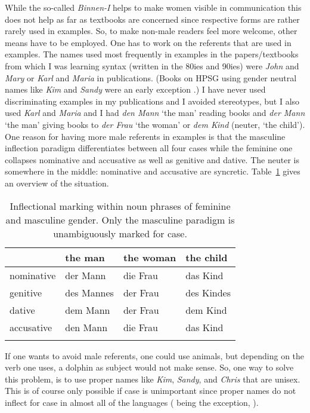 While the so-called \emph{Binnen-I} helps to make women visible in communication this does not help
as far as textbooks are concerned since respective forms are rather rarely used in examples. So, to
make non-male readers feel more welcome, other means have to be employed. One has to work on the
referents that are used in examples. The names used most frequently in examples in the papers/textbooks from which I was learning syntax
(written in the 80ies and 90ies) were \emph{John} and \emph{Mary} or \emph{Karl} and \emph{Maria} in
 publications. (Books on HPSG using gender neutral names like \emph{Kim} and \emph{Sandy} were an early exception \citep{ps,ps2}.)
I have never used discriminating examples in my publications and I avoided stereotypes, but I also used
\emph{Karl} and \emph{Maria} and I had \emph{den Mann} `the man' reading books and \emph{der Mann}
`the man' giving books to \emph{der Frau} `the woman' or \emph{dem Kind} (neuter, `the child'). One
reason for having more male referents in  examples is that the masculine inflection paradigm
differentiates between all four cases while the feminine one collapses nominative and accusative as
well as genitive and dative. The neuter is somewhere in the middle: nominative and accusative are syncretic. Table~\ref{table-German-case-syncretism} gives an overview of the situation.
\begin{table}
\begin{tabular}{llll}\lsptoprule
           & the man    & the woman & the child\\\midrule
nominative & der Mann   & die Frau  & das Kind\\
genitive   & des Mannes & der Frau  & des Kindes\\
dative     & dem Mann   & der Frau  & dem Kind\\
accusative & den Mann   & die Frau  & das Kind\\
\lspbottomrule
\end{tabular}
\caption{\label{table-German-case-syncretism}Inflectional marking within noun phrases of feminine and masculine gender. Only the masculine
  paradigm is unambiguously marked for case.}
\end{table}  
If one wants to avoid male referents, one could use animals, but depending on the verb one
uses, a dolphin as subject would not make sense. So, one way to solve this problem, is to use proper
names like \emph{Kim}, \emph{Sandy}, and \emph{Chris} that are unisex. This is of course only
possible if case is unimportant since proper names do not inflect for case in almost all of the 
languages ( being the exception, \citealp[]{ZMT85a}). 

